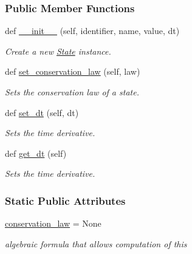 \subsubsection*{Public Member Functions}
\begin{DoxyCompactItemize}
\item 
def \mbox{\hyperlink{classamici_1_1ode__export_1_1_state_a6d1dffcaf03a86ff057810e5eed3b464}{\+\_\+\+\_\+init\+\_\+\+\_\+}} (self, identifier, name, value, dt)
\begin{DoxyCompactList}\small\item\em Create a new \mbox{\hyperlink{classamici_1_1ode__export_1_1_state}{State}} instance. \end{DoxyCompactList}\item 
def \mbox{\hyperlink{classamici_1_1ode__export_1_1_state_a2b2539f11e691051b47456a8191aa91b}{set\+\_\+conservation\+\_\+law}} (self, law)
\begin{DoxyCompactList}\small\item\em Sets the conservation law of a state. \end{DoxyCompactList}\item 
def \mbox{\hyperlink{classamici_1_1ode__export_1_1_state_ab241f0ff9ea890217ba44ec670c9dbbd}{set\+\_\+dt}} (self, dt)
\begin{DoxyCompactList}\small\item\em Sets the time derivative. \end{DoxyCompactList}\item 
def \mbox{\hyperlink{classamici_1_1ode__export_1_1_state_a76a215855520a5ed9d41bfddf22b1162}{get\+\_\+dt}} (self)
\begin{DoxyCompactList}\small\item\em Sets the time derivative. \end{DoxyCompactList}\end{DoxyCompactItemize}
\subsubsection*{Static Public Attributes}
\begin{DoxyCompactItemize}
\item 
\mbox{\label{classamici_1_1ode__export_1_1_state_a8cc98ce254708f8d4c493455d6492802}} 
\mbox{\hyperlink{classamici_1_1ode__export_1_1_state_a8cc98ce254708f8d4c493455d6492802}{conservation\+\_\+law}} = None
\begin{DoxyCompactList}\small\item\em algebraic formula that allows computation of this \end{DoxyCompactList}\end{DoxyCompactItemize}


